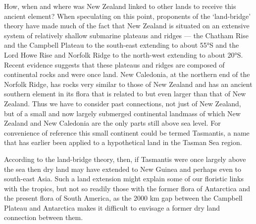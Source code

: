 How, when and where was New Zealand linked to other lands to receive this ancient element? When speculating on this point, proponents of the `land-bridge' theory have made much of the fact that New Zealand is situated on an extensive system of relatively shallow submarine plateaus and ridges --- the Chatham Rise and the Campbell Plateau to the south-east extending to about 55°S and the Lord Howe Rise and Norfolk Ridge to the north-west extending to about 20°S.
Recent evidence suggests that these plateaus and ridges are composed of continental rocks and were once land.
New Caledonia, at the northern end of the Norfolk Ridge, has rocks very similar to those of New Zealand and has an ancient southern element in its flora that is related to but even larger than that of New Zealand.
Thus we have to consider past connections, not just of New Zealand, but of a small and now largely submerged continental landmass of which New Zealand and New Caledonia are the only parts still above sea level.
For convenience of reference this small continent could be termed Tasmantis, a name that has earlier been applied to a hypothetical land in the Tasman Sea region.

According to the land-bridge theory, then, if Tasmantis were once largely above the sea then dry land may have extended to New Guinea and perhaps even to south-east Asia.
Such a land extension might explain some of our floristic links with the tropics, but not so readily those with the former flora of Antarctica and the present flora of South America, as the 2000 km gap between the Campbell Plateau and Antarctica makes it difficult to envisage a former dry land connection between them.

